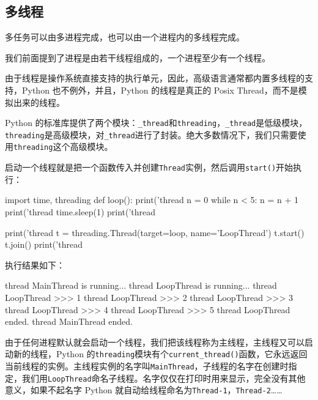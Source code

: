 \hypertarget{ux591aux7ebfux7a0b}{%
\subsection{多线程}\label{ux591aux7ebfux7a0b}}

多任务可以由多进程完成，也可以由一个进程内的多线程完成。

我们前面提到了进程是由若干线程组成的，一个进程至少有一个线程。

由于线程是操作系统直接支持的执行单元，因此，高级语言通常都内置多线程的支持，Python
也不例外，并且，Python 的线程是真正的 Posix
Thread，而不是模拟出来的线程。

Python
的标准库提供了两个模块：\texttt{\_thread}和\texttt{threading}，\texttt{\_thread}是低级模块，\texttt{threading}是高级模块，对\texttt{\_thread}进行了封装。绝大多数情况下，我们只需要使用\texttt{threading}这个高级模块。

启动一个线程就是把一个函数传入并创建\texttt{Thread}实例，然后调用\texttt{start()}开始执行：

\begin{pythoncode}
import time, threading
def loop():
    print('thread %
    n = 0
    while n < 5:
        n = n + 1
        print('thread %
        time.sleep(1)
    print('thread %

print('thread %
t = threading.Thread(target=loop, name='LoopThread')
t.start()
t.join()
print('thread %
\end{pythoncode}

执行结果如下：

\begin{pythoncode}
thread MainThread is running...
thread LoopThread is running...
thread LoopThread >>> 1
thread LoopThread >>> 2
thread LoopThread >>> 3
thread LoopThread >>> 4
thread LoopThread >>> 5
thread LoopThread ended.
thread MainThread ended.
\end{pythoncode}

由于任何进程默认就会启动一个线程，我们把该线程称为主线程，主线程又可以启动新的线程，Python
的\texttt{threading}模块有个\texttt{current\_thread()}函数，它永远返回当前线程的实例。主线程实例的名字叫\texttt{MainThread}，子线程的名字在创建时指定，我们用\texttt{LoopThread}命名子线程。名字仅仅在打印时用来显示，完全没有其他意义，如果不起名字
Python
就自动给线程命名为\texttt{Thread-1}，\texttt{Thread-2}\ldots\ldots{}

